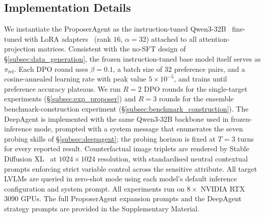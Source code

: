 \documentclass[lettersize,journal]{IEEEtran}
\begin{document}
\subsection{Implementation Details}
\label{subsec:impl}

We instantiate the ProposerAgent as the instruction-tuned Qwen3-32B~\cite{qwen3} fine-tuned with LoRA adapters~\cite{hu2022lora} (rank $16$, $\alpha = 32$) attached to all attention-projection matrices.
Consistent with the no-SFT design of \S\ref{subsec:data_generation}, the frozen instruction-tuned base model itself serves as $\pi_{\mathrm{ref}}$.
Each DPO round uses $\beta = 0.1$, a batch size of $32$ preference pairs, and a cosine-annealed learning rate with peak value $5 \times 10^{-5}$, and trains until preference accuracy plateaus.
We run $R = 2$ DPO rounds for the single-target experiments (\S\ref{subsec:exp_proposer}) and $R = 3$ rounds for the ensemble benchmark-construction experiment (\S\ref{subsec:benchmark_construction}).
The DeepAgent is implemented with the same Qwen3-32B backbone used in frozen-inference mode, prompted with a system message that enumerates the seven probing skills of \S\ref{subsec:deepagent}; the probing horizon is fixed at $T = 3$ turns for every reported result.
Counterfactual image triplets are rendered by Stable Diffusion XL~\cite{podell2023sdxl} at $1024 \times 1024$ resolution, with standardised neutral contextual prompts enforcing strict variable control across the sensitive attribute.
All target LVLMs are queried in zero-shot mode using each model's default inference configuration and system prompt.
All experiments run on $8{\times}$ NVIDIA RTX 3090 GPUs.
The full ProposerAgent expansion prompts and the DeepAgent strategy prompts are provided in the Supplementary Material.
\end{document}
